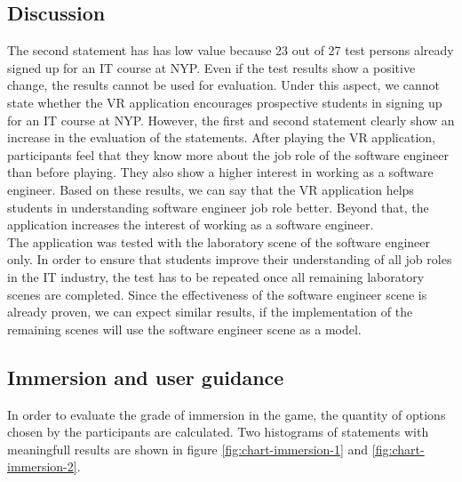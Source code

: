 \newpage
\subsection{Discussion}
The second statement has has low value because 23 out of 27 test persons already signed up for an IT course at NYP. Even if the test results show a positive change, the results cannot be used for evaluation. Under this aspect, we cannot state whether the VR application encourages prospective students in signing up for an IT course at NYP.
However, the first and second statement clearly show an increase in the evaluation of the statements. After playing the VR application, participants feel that they know more about the job role of the software engineer than before playing. They also show a higher interest in working as a software engineer. Based on these results, we can say that the VR application helps students in understanding software engineer job role better. Beyond that, the application increases the interest of working as a software engineer. \\
The application was tested with the laboratory scene of the software engineer only. In order to ensure that students improve their understanding of all job roles in the IT industry, the test has to be repeated once all remaining laboratory scenes are completed. Since the effectiveness of the software engineer scene is already proven, we can expect similar results, if the implementation of the remaining scenes will use the software engineer scene as a model.

\subsection{Immersion and user guidance}
In order to evaluate the grade of immersion in the game, the quantity of options chosen by the participants are calculated. Two histograms of statements with meaningfull results are shown in figure \ref{fig:chart-immersion-1} and \ref{fig:chart-immersion-2}.

